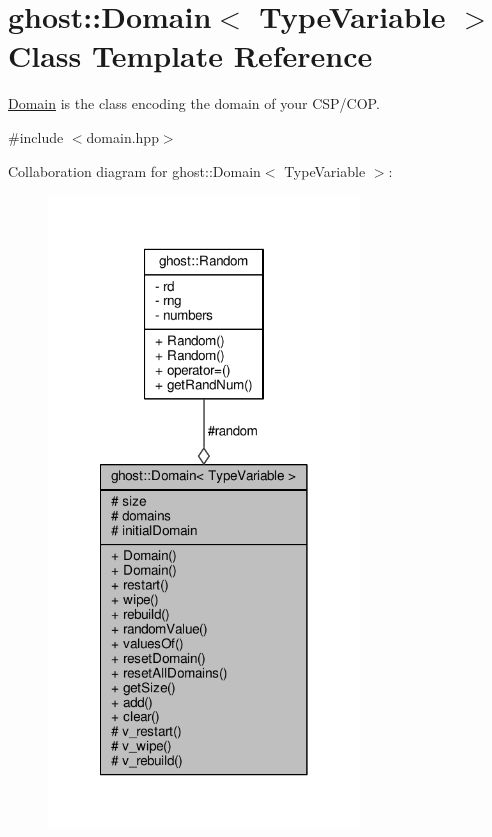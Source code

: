 \hypertarget{classghost_1_1Domain}{\section{ghost\-:\-:Domain$<$ Type\-Variable $>$ Class Template Reference}
\label{classghost_1_1Domain}
}


\hyperlink{classghost_1_1Domain}{Domain} is the class encoding the domain of your C\-S\-P/\-C\-O\-P.  




{\ttfamily \#include $<$domain.\-hpp$>$}



Collaboration diagram for ghost\-:\-:Domain$<$ Type\-Variable $>$\-:\nopagebreak
\begin{figure}[H]
\begin{center}
\leavevmode
\includegraphics[width=234pt]{classghost_1_1Domain__coll__graph}
\end{center}
\end{figure}
